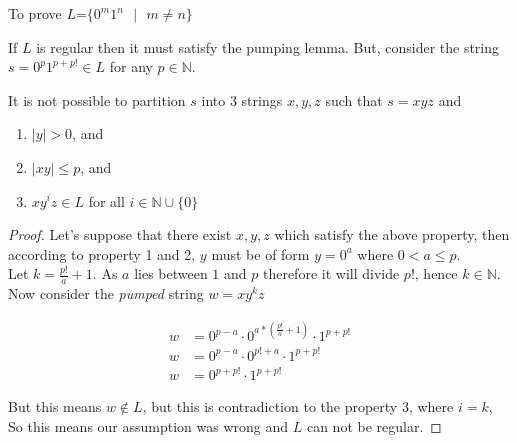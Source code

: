 \begin{soln}

To prove $L$=$\{0^m1^n\text{ }|\text{ }m\neq n\}$

If $L$ is regular then it must satisfy the pumping lemma. But, consider the string $s = 0^p 1^{p+p!} \in L$ for any $p \in \mathbb{N}$.
\begin{claim}
    It is not possible to partition $s$ into 3 strings $x, y, z$ such that $s = xyz$ and
    \begin{enumerate}
        \item $|y| > 0$, and
        \item $|xy| \leq p$, and
        \item $x y^i z \in L$ for all $i \in \mathbb{N} \cup \{0\}$
    \end{enumerate}
\end{claim}

\begin{proof}
Let's suppose that there exist $x,y,z$ which satisfy the above property, then according to property 1 and 2, $y$ must be of form $y=0^a$ where $0<a\leq p$.\\

Let $k=\frac{p!}{a}+1$. As $a$ lies between $1$ and $p$ therefore it will divide $p!$, hence $k \in \mathbb{N}$.\\

Now consider the \emph{pumped} string $w=x y^k z$

\begin{align*}
w &= 0^{p-a} \cdot 0^{a*(\frac{p!}{a}+1)} \cdot 1^{p+p!}\\
w &= 0^{p-a} \cdot 0^{p!+a} \cdot  1^{p+p!}\\
w &= 0^{p+p!} \cdot 1^{p+p!}
\end{align*}

But this means $w \notin L$, but this is contradiction to the property 3, where $i=k$, So this means our assumption was wrong and $L$ can not be regular.

\end{proof}

\end{soln}